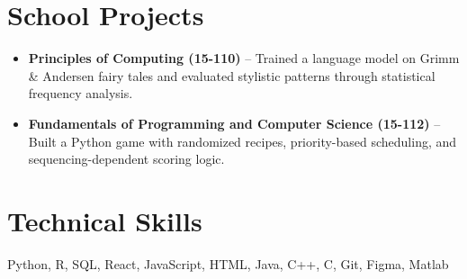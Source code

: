 \documentclass[10.5pt]{article}
\begin{document}
\section{School Projects}
\begin{itemize}
  \item \textbf{Principles of Computing (15-110)} – Trained a language model on Grimm \& Andersen fairy tales and evaluated stylistic patterns through statistical frequency analysis. 
  \item \textbf{Fundamentals of Programming and Computer Science (15-112)} – Built a Python game with randomized recipes, priority-based scheduling, and sequencing-dependent scoring logic.
\end{itemize}
\section{Technical Skills}
Python, R, SQL, React, JavaScript, HTML, Java, C++, C, Git, Figma, Matlab
\end{document}
